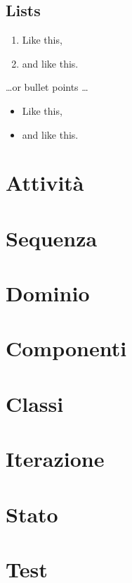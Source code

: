\documentclass[12pt]{article}
\begin{document}
\subsection{Lists}

\begin{enumerate}
\item Like this,
\item and like this.
\end{enumerate}
\dots or bullet points \dots
\begin{itemize}
\item Like this,
\item and like this.
\end{itemize}

\section{Attività}

\section{Sequenza}

\section{Dominio}

\section{Componenti}

\section{Classi}

\section{Iterazione}

\section{Stato}

\section{Test}
\end{document}
